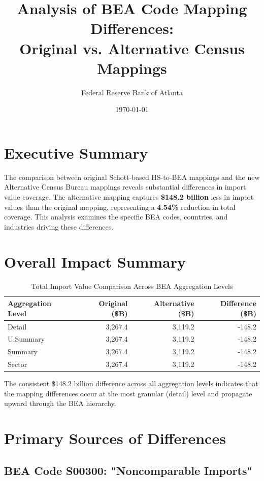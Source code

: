 \documentclass[11pt]{article}
\title{Analysis of BEA Code Mapping Differences: \\
Original vs. Alternative Census Mappings}
\author{Federal Reserve Bank of Atlanta}
\date{\today}
\begin{document}
\maketitle

\section{Executive Summary}

The comparison between original Schott-based HS-to-BEA mappings and the new Alternative Census Bureau mappings reveals substantial differences in import value coverage. The alternative mapping captures \textbf{\$148.2 billion} less in import values than the original mapping, representing a \textbf{4.54\%} reduction in total coverage. This analysis examines the specific BEA codes, countries, and industries driving these differences.

\section{Overall Impact Summary}

\begin{table}[H]
\centering
\caption{Total Import Value Comparison Across BEA Aggregation Levels}
\begin{tabular}{lrrr}
\toprule
\textbf{Aggregation Level} & \textbf{Original (\$B)} & \textbf{Alternative (\$B)} & \textbf{Difference (\$B)} \\
\midrule
Detail & 3,267.4 & 3,119.2 & -148.2 \\
U.Summary & 3,267.4 & 3,119.2 & -148.2 \\
Summary & 3,267.4 & 3,119.2 & -148.2 \\
Sector & 3,267.4 & 3,119.2 & -148.2 \\
\bottomrule
\end{tabular}
\label{tab:overall_impact}
\end{table}

The consistent \$148.2 billion difference across all aggregation levels indicates that the mapping differences occur at the most granular (detail) level and propagate upward through the BEA hierarchy.

\section{Primary Sources of Differences}

\subsection{BEA Code S00300: "Noncomparable Imports"}
\end{document}
